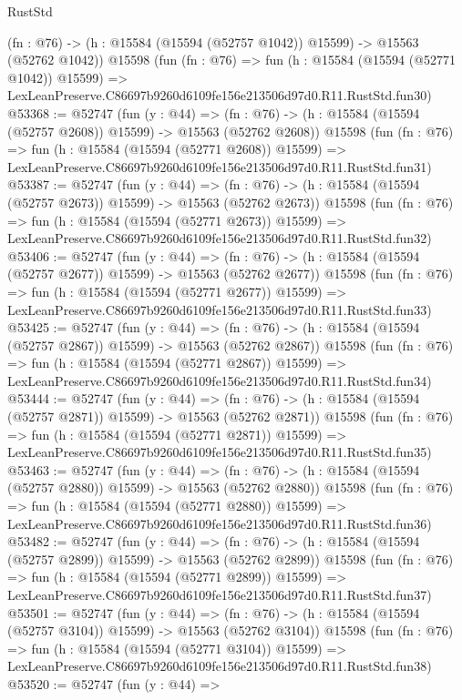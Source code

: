 \begin{lexlean}{RustStd}
\begin{coremodule}
    (fn : @76) -> (h : @15584 (@15594 (@52757 @1042)) @15599) -> @15563 (@52762 @1042))
    @15598
    (fun (fn : @76) =>
    fun (h : @15584 (@15594 (@52771 @1042)) @15599) =>
    LexLeanPreserve.C86697b9260d6109fe156e213506d97d0.R11.RustStd.fun30)
@53368 := @52747
    (fun (y : @44) =>
    (fn : @76) -> (h : @15584 (@15594 (@52757 @2608)) @15599) -> @15563 (@52762 @2608))
    @15598
    (fun (fn : @76) =>
    fun (h : @15584 (@15594 (@52771 @2608)) @15599) =>
    LexLeanPreserve.C86697b9260d6109fe156e213506d97d0.R11.RustStd.fun31)
@53387 := @52747
    (fun (y : @44) =>
    (fn : @76) -> (h : @15584 (@15594 (@52757 @2673)) @15599) -> @15563 (@52762 @2673))
    @15598
    (fun (fn : @76) =>
    fun (h : @15584 (@15594 (@52771 @2673)) @15599) =>
    LexLeanPreserve.C86697b9260d6109fe156e213506d97d0.R11.RustStd.fun32)
@53406 := @52747
    (fun (y : @44) =>
    (fn : @76) -> (h : @15584 (@15594 (@52757 @2677)) @15599) -> @15563 (@52762 @2677))
    @15598
    (fun (fn : @76) =>
    fun (h : @15584 (@15594 (@52771 @2677)) @15599) =>
    LexLeanPreserve.C86697b9260d6109fe156e213506d97d0.R11.RustStd.fun33)
@53425 := @52747
    (fun (y : @44) =>
    (fn : @76) -> (h : @15584 (@15594 (@52757 @2867)) @15599) -> @15563 (@52762 @2867))
    @15598
    (fun (fn : @76) =>
    fun (h : @15584 (@15594 (@52771 @2867)) @15599) =>
    LexLeanPreserve.C86697b9260d6109fe156e213506d97d0.R11.RustStd.fun34)
@53444 := @52747
    (fun (y : @44) =>
    (fn : @76) -> (h : @15584 (@15594 (@52757 @2871)) @15599) -> @15563 (@52762 @2871))
    @15598
    (fun (fn : @76) =>
    fun (h : @15584 (@15594 (@52771 @2871)) @15599) =>
    LexLeanPreserve.C86697b9260d6109fe156e213506d97d0.R11.RustStd.fun35)
@53463 := @52747
    (fun (y : @44) =>
    (fn : @76) -> (h : @15584 (@15594 (@52757 @2880)) @15599) -> @15563 (@52762 @2880))
    @15598
    (fun (fn : @76) =>
    fun (h : @15584 (@15594 (@52771 @2880)) @15599) =>
    LexLeanPreserve.C86697b9260d6109fe156e213506d97d0.R11.RustStd.fun36)
@53482 := @52747
    (fun (y : @44) =>
    (fn : @76) -> (h : @15584 (@15594 (@52757 @2899)) @15599) -> @15563 (@52762 @2899))
    @15598
    (fun (fn : @76) =>
    fun (h : @15584 (@15594 (@52771 @2899)) @15599) =>
    LexLeanPreserve.C86697b9260d6109fe156e213506d97d0.R11.RustStd.fun37)
@53501 := @52747
    (fun (y : @44) =>
    (fn : @76) -> (h : @15584 (@15594 (@52757 @3104)) @15599) -> @15563 (@52762 @3104))
    @15598
    (fun (fn : @76) =>
    fun (h : @15584 (@15594 (@52771 @3104)) @15599) =>
    LexLeanPreserve.C86697b9260d6109fe156e213506d97d0.R11.RustStd.fun38)
@53520 := @52747
    (fun (y : @44) =>

\end{coremodule}
\end{lexlean}
